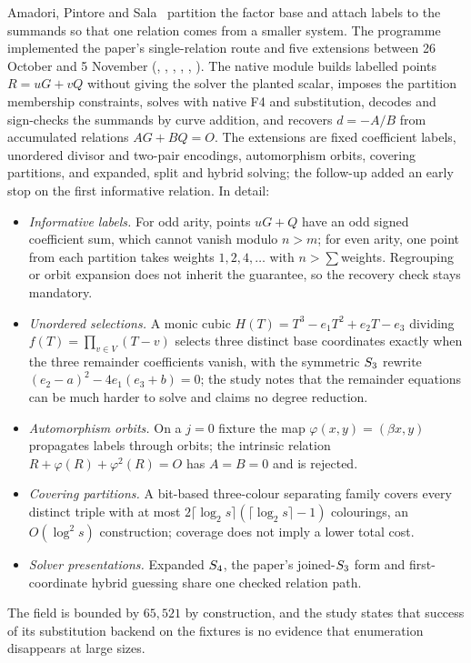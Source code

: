 Amadori, Pintore and Sala~\cite{aps2018} partition the factor base and
attach labels to the summands so that one relation comes from a smaller
system. The programme implemented the paper's single-relation route and
five extensions between 26 October and 5 November
(,
,
,
,
,
). The native module builds labelled
points $R=uG+vQ$ without giving the solver the planted scalar, imposes the
partition membership constraints, solves with native F4 and substitution,
decodes and sign-checks the summands by curve addition, and recovers
$d=-A/B$ from accumulated relations $AG+BQ=O$. The extensions are fixed
coefficient labels, unordered divisor and two-pair encodings, automorphism
orbits, covering partitions, and expanded, split and hybrid solving; the
follow-up added an early stop on the first informative relation. In
detail:
\begin{itemize}
\item \emph{Informative labels.} For odd arity, points $uG+Q$ have an odd
  signed coefficient sum, which cannot vanish modulo $n>m$; for even arity,
  one point from each partition takes weights $1,2,4,\dots$ with
  $n>\sum$weights. Regrouping or orbit expansion does not inherit the
  guarantee, so the recovery check stays mandatory.
\item \emph{Unordered selections.} A monic cubic
  $H(T)=T^3-e_1T^2+e_2T-e_3$ dividing $f(T)=\prod_{v\in V}(T-v)$ selects three
  distinct base coordinates exactly when the three remainder coefficients
  vanish, with the symmetric $S_{3}$ rewrite $(e_2-a)^2-4e_1(e_3+b)=0$; the
  study notes that the remainder equations can be much harder to solve and
  claims no degree reduction.
\item \emph{Automorphism orbits.} On a $j=0$ fixture the map
  $\varphi(x,y)=(\beta x,y)$ propagates labels through orbits; the intrinsic
  relation $R+\varphi(R)+\varphi^2(R)=O$ has $A=B=0$ and is rejected.
\item \emph{Covering partitions.} A bit-based three-colour separating
  family covers every distinct triple with at most
  $2\lceil\log_2s\rceil(\lceil\log_2s\rceil-1)$ colourings, an $O(\log^2s)$
  construction; coverage does not imply a lower total cost.
\item \emph{Solver presentations.} Expanded $S_{4}$, the paper's joined-$S_{3}$
  form and first-coordinate hybrid guessing share one checked relation path.
\end{itemize}
The field is bounded by $65{,}521$ by construction, and the study states
that success of its substitution backend on the fixtures is no evidence
that enumeration disappears at large sizes.

